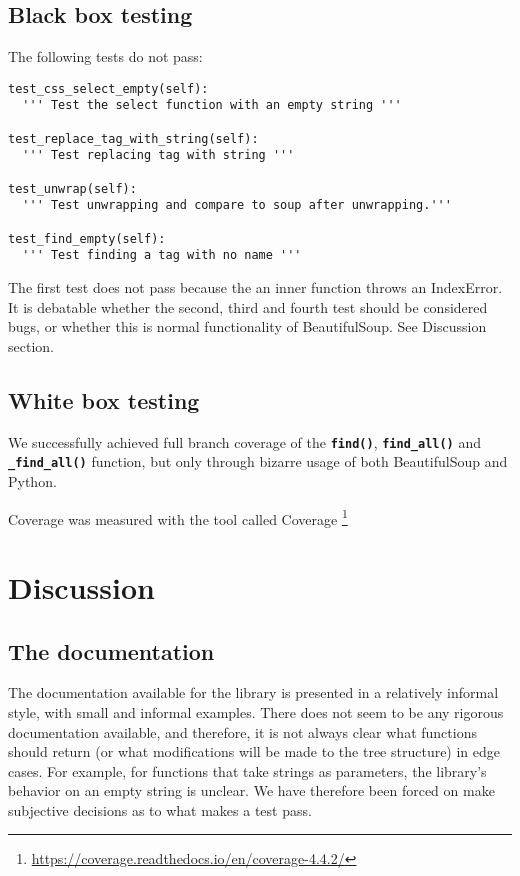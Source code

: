 \documentclass[10pt]{article}
\newcommand{\tbt}[1]{\texttt{\textbf{#1}}}
\begin{document}
\subsection{Black box testing}

The following tests do not pass:

\begin{lstlisting}[style = pythonstyle]
test_css_select_empty(self):
  ''' Test the select function with an empty string '''

test_replace_tag_with_string(self):
  ''' Test replacing tag with string '''

test_unwrap(self):
  ''' Test unwrapping and compare to soup after unwrapping.'''

test_find_empty(self):
  ''' Test finding a tag with no name '''
\end{lstlisting}

The first test does not pass because the an inner function throws an IndexError. \\
It is debatable whether the second, third and fourth test should be considered bugs, or whether this is normal functionality of BeautifulSoup. See Discussion section.

\subsection{White box testing}

We successfully achieved full branch coverage of the \tbt{find()}, \tbt{find\_all()} and \tbt{\_find\_all()} function, but only through bizarre usage of both BeautifulSoup and Python. 

Coverage was measured with the tool called Coverage \footnote{\url{https://coverage.readthedocs.io/en/coverage-4.4.2/}}

\section{Discussion}

\subsection{The documentation}

The documentation available for the library is presented in a relatively informal style, with small and informal examples. There does not seem to be any rigorous documentation available, and therefore, it is not always clear what functions should return (or what modifications will be made to the tree structure) in edge cases. For example, for functions that take strings as parameters, the library's behavior on an empty string is unclear. We have therefore been forced on make subjective decisions as to what makes a test pass. 
\end{document}
